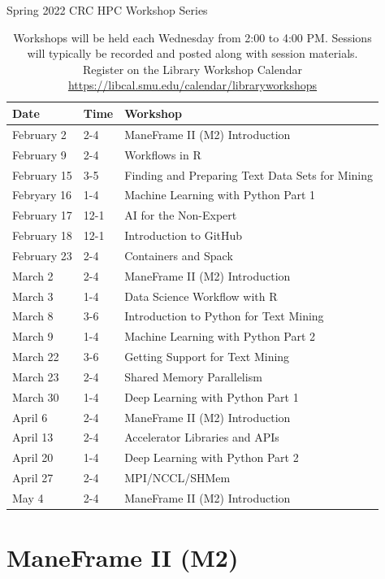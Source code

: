 \begin{frame}{Spring 2022 CRC HPC Workshop Series}
\begin{table}
\tiny
\begin{tabular}{lll}
Date     & Time  & Workshop\\
\hline
February 2 & 2-4 & ManeFrame II (M2) Introduction \\  
February 9 & 2-4 & Workflows in R \\  
February 15 & 3-5 & Finding and Preparing Text Data Sets for Mining \\
Febryary 16 & 1-4 & Machine Learning with Python Part 1 \\
February 17 & 12-1 & AI for the Non-Expert \\
February 18 & 12-1 & Introduction to GitHub \\        
February 23 & 2-4  & Containers and Spack \\     
March 2   &  2-4 &  ManeFrame II (M2) Introduction \\
March 3   &  1-4 & Data Science Workflow with R \\  
March 8   &  3-6 & Introduction to Python for Text Mining \\ 
March 9   &  1-4 & Machine Learning with Python Part 2 \\ 
March 22  &  3-6 & Getting Support for Text Mining \\  
March 23  &  2-4 & Shared Memory Parallelism \\   
March 30  &  1-4 & Deep Learning with Python Part 1 \\   
April 6   &  2-4 & ManeFrame II (M2) Introduction \\    
April 13  &  2-4 & Accelerator Libraries and APIs \\    
April 20  &  1-4 & Deep Learning with Python Part 2 \\      
April 27  &  2-4 & MPI/NCCL/SHMem \\            
May 4     &  2-4 & ManeFrame II (M2) Introduction      
\end{tabular}
\caption{Workshops will be held each Wednesday from 2:00 to 4:00 PM. Sessions will typically be                                
recorded and posted along with session materials.         
Register on the Library Workshop Calendar \href{https://libcal.smu.edu/calendar/libraryworkshops}{https://libcal.smu.edu/calendar/libraryworkshops}
}
\end{table}
\end{frame}

\section{ManeFrame II (M2)}

